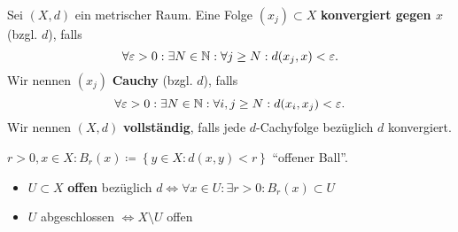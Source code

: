 \begin{subdefinition}
	Sei $ (X, d) $ ein metrischer Raum. Eine Folge $ (x_j) \subset X $ \textbf{konvergiert gegen $ x $} (bzgl. $ d $), falls
	\[
		\forall \varepsilon > 0: \exists N \in \mathbb{N} : \forall j \geq N: d(x_j, x) < \varepsilon .
	\]
	Wir nennen $ (x_j) $ \textbf{Cauchy} (bzgl. $ d $), falls
	\[
		\forall \varepsilon > 0 : \exists N \in \mathbb{N} : \forall i, j \geq N : d(x_i, x_j) < \varepsilon .
	\]
	Wir nennen $ (X, d) $ \textbf{vollständig}, falls jede $ d $-Cachyfolge bezüglich $ d $ konvergiert.
\end{subdefinition}

$ r > 0 , x \in X : B_{r}(x) \coloneqq \left\{ y \in X : d(x, y) < r \right\}  $ ``offener Ball''.
\begin{itemize}
	\item  $ U \subset X $ \textbf{offen} bezüglich $ d \iff \forall x \in U : \exists r > 0 : B_{r}(x) \subset U $ 
	\item $ U $ abgeschlossen $ \iff X \setminus U $ offen
\end{itemize}

